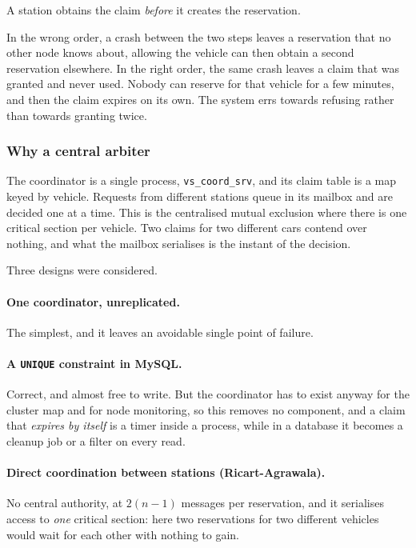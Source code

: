A station obtains the claim \emph{before} it creates the reservation.

In the wrong order, a crash between the two steps leaves a reservation that no
other node knows about, allowing the vehicle can then obtain a second reservation
elsewhere. In the right order, the same crash leaves a claim that was granted and
never used. Nobody can reserve for that vehicle for a few minutes, and then the
claim expires on its own. The system errs towards refusing rather than towards
granting twice.

\subsubsection{Why a central arbiter}

The coordinator is a single process, \texttt{vs\_coord\_srv}, and its claim table
is a map keyed by vehicle. Requests from different stations queue in its mailbox
and are decided one at a time. This is the centralised mutual exclusion where there is one critical section per vehicle. Two claims for two different cars
contend over nothing, and what the mailbox serialises is the instant of the
decision.

Three designs were considered.

\paragraph{One coordinator, unreplicated.} The simplest, and it leaves an
avoidable single point of failure.

\paragraph{A \texttt{UNIQUE} constraint in MySQL.} Correct, and almost free to
write. But the coordinator has to exist anyway for the cluster map and for node
monitoring, so this removes no component, and a claim that \emph{expires by
itself} is a timer inside a process, while in a database it becomes a cleanup job
or a filter on every read.

\paragraph{Direct coordination between stations (Ricart-Agrawala).} No central
authority, at $2(n-1)$ messages per reservation, and it serialises access to
\emph{one} critical section: here two reservations for two different vehicles
would wait for each other with nothing to gain.

